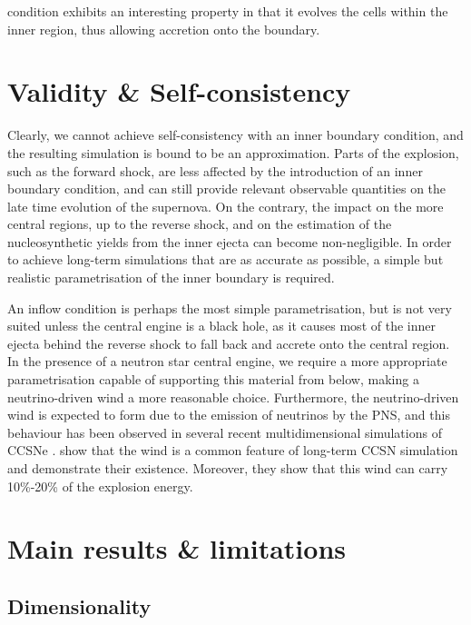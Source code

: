 condition exhibits an interesting property in that it evolves the cells within the inner region, thus allowing accretion onto the boundary.

\section{Validity \& Self-consistency}

Clearly, we cannot achieve self-consistency with an inner boundary condition, and the resulting simulation is bound to be an approximation. Parts of the explosion, such as the forward shock, are less affected by the introduction of an inner boundary condition, and can still provide relevant observable quantities on the late time evolution of the supernova. On the contrary, the impact on the more central regions, up to the reverse shock, and on the estimation of the nucleosynthetic yields from the inner ejecta can become non-negligible. In order to achieve long-term simulations that are as accurate as possible, a simple but realistic parametrisation of the inner boundary is required.

An inflow condition is perhaps the most simple parametrisation, but is not very suited unless the central engine is a black hole, as it causes most of the inner ejecta behind the reverse shock to fall back and accrete onto the central region. In the presence of a neutron star central engine, we require a more appropriate parametrisation capable of supporting this material from below, making a neutrino-driven wind a more reasonable choice. Furthermore, the neutrino-driven wind is expected to form due to the emission of neutrinos by the PNS, and this behaviour has been observed in several recent multidimensional simulations of CCSNe \citep{Witt2021,Navo2023,Wang2023}. \cite{Wang2023} show that the wind is a common feature of long-term CCSN simulation and demonstrate their existence. Moreover, they show that this wind can carry 10\%-20\% of the explosion energy.

\section{Main results \& limitations}

\subsection{Dimensionality}

